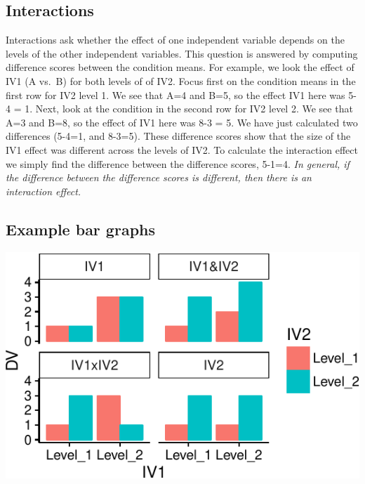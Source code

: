 \subsection{Interactions}\label{interactions-1}

Interactions ask whether the effect of one independent variable depends
on the levels of the other independent variables. This question is
answered by computing difference scores between the condition means. For
example, we look the effect of IV1 (A vs.~B) for both levels of of IV2.
Focus first on the condition means in the first row for IV2 level 1. We
see that A=4 and B=5, so the effect IV1 here was 5-4 = 1. Next, look at
the condition in the second row for IV2 level 2. We see that A=3 and
B=8, so the effect of IV1 here was 8-3 = 5. We have just calculated two
differences (5-4=1, and 8-3=5). These difference scores show that the
size of the IV1 effect was different across the levels of IV2. To
calculate the interaction effect we simply find the difference between
the difference scores, 5-1=4. \emph{In general, if the difference
between the difference scores is different, then there is an interaction
effect.}

\subsection{Example bar graphs}\label{example-bar-graphs}

\includegraphics{Factorial_files/figure-latex/unnamed-chunk-13-1}

